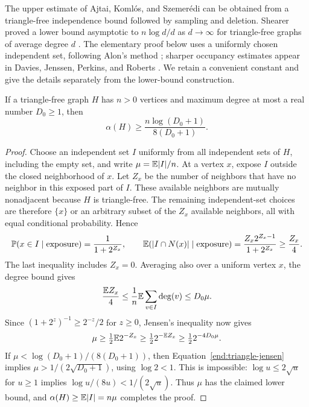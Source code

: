 The upper estimate of Ajtai, Koml\'os, and Szemer\'edi \cite{AKS1980}
can be obtained from a triangle-free independence bound followed by
sampling and deletion. Shearer proved a lower bound asymptotic to
$n\log d/d$ as $d\to\infty$ for triangle-free graphs of average degree $d$
\cite{Shearer1983}. The elementary proof below uses a uniformly chosen
independent set, following Alon's method
\cite[proof of Proposition~2.1]{Alon1996}; sharper
occupancy estimates appear in Davies, Jenssen, Perkins, and Roberts
\cite[Theorems~1 and~3]{DJPR2018}. We retain a convenient constant and give the details
separately from the lower-bound construction.

\begin{lemma}
\label{end:triangle-free}
If a triangle-free graph $H$ has $n>0$ vertices and maximum degree at
most a real number $D_0\ge1$, then
\[
 \alpha(H)\ge\frac{n\log(D_0+1)}{8(D_0+1)}.
\]
\end{lemma}

\begin{proof}
Choose an independent set $I$ uniformly from all independent sets of
$H$, including the empty set, and write $\mu=\mathbb E|I|/n$.
At a vertex $x$, expose $I$ outside the closed neighborhood of $x$.
Let $Z_x$ be the number of neighbors that have no neighbor in this
exposed part of $I$. These available neighbors are mutually
nonadjacent because $H$ is triangle-free. The remaining independent-set
choices are therefore $\{x\}$ or an arbitrary subset of the $Z_x$
available neighbors, all with equal conditional probability. Hence
\[
 \mathbb P(x\in I\mid\text{exposure})=\frac1{1+2^{Z_x}},
 \qquad
 \mathbb E(|I\cap N(x)|\mid\text{exposure})
   =\frac{Z_x2^{Z_x-1}}{1+2^{Z_x}}\ge\frac{Z_x}{4}.
\]
The last inequality includes $Z_x=0$.
Averaging also over a uniform vertex $x$, the degree bound gives
\[
 \frac{\mathbb E Z_x}{4}
 \le\frac1n\mathbb E\sum_{v\in I}\deg(v)\le D_0\mu.
\]
Since $(1+2^z)^{-1}\ge2^{-z}/2$ for $z\ge0$, Jensen's inequality
now gives
\begin{equation}
 \mu\ge\tfrac12\mathbb E 2^{-Z_x}
       \ge\tfrac12 2^{-\mathbb E Z_x}
       \ge\tfrac12 2^{-4D_0\mu}.
 \label{end:triangle-jensen}
\end{equation}
If $\mu<\log(D_0+1)/(8(D_0+1))$, then
Equation~\eqref{end:triangle-jensen} implies
$\mu>1/(2\sqrt{D_0+1})$, using $\log2<1$.
This is impossible: $\log u\le2\sqrt u$ for $u\ge1$ implies
$\log u/(8u)<1/(2\sqrt u)$. Thus $\mu$ has the claimed lower
bound, and $\alpha(H)\ge\mathbb E|I|=n\mu$ completes the proof.
\end{proof}


